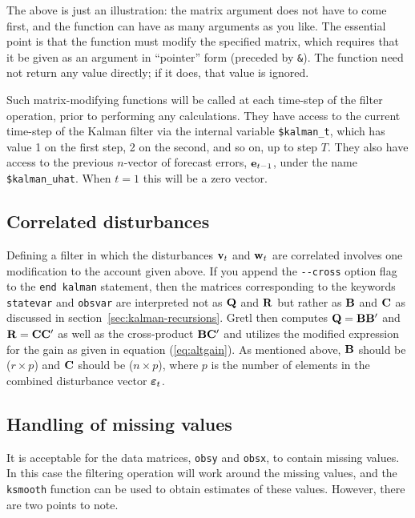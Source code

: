 The above is just an illustration: the matrix argument does not have
to come first, and the function can have as many arguments as you
like.  The essential point is that the function must modify the
specified matrix, which requires that it be given as an argument in
``pointer'' form (preceded by \verb|&|).  The function need not return
any value directly; if it does, that value is ignored.

Such matrix-modifying functions will be called at each time-step of
the filter operation, prior to performing any calculations.  They have
access to the current time-step of the Kalman filter via the internal
variable \verb+$kalman_t+, which has value 1 on the first step, 2 on
the second, and so on, up to step $T$.  They also have access to the
previous $n$-vector of forecast errors, $\mathbf{e}_{t-1}$, under the
name \verb+$kalman_uhat+.  When $t=1$ this will be a zero vector.

\subsection{Correlated disturbances}

Defining a filter in which the disturbances $\mathbf{v}_t$ and
$\mathbf{w}_t$ are correlated involves one modification to the account
given above.  If you append the \verb|--cross| option flag to the
\texttt{end kalman} statement, then the matrices corresponding to
the keywords \texttt{statevar} and \texttt{obsvar} are interpreted
not as $\mathbf{Q}$ and $\mathbf{R}$ but rather as $\mathbf{B}$ and
$\mathbf{C}$ as discussed in section~\ref{sec:kalman-recursions}.
Gretl then computes $\mathbf{Q} = \mathbf{B}\mathbf{B}'$ and
$\mathbf{R} = \mathbf{C}\mathbf{C}'$ as well as the cross-product
$\mathbf{B}\mathbf{C}'$ and utilizes the modified expression for
the gain as given in equation (\ref{eq:altgain}).  As mentioned
above, $\mathbf{B}$ should be ($r \times p$) and $\mathbf{C}$
should be ($n \times p$), where $p$ is the number of elements
in the combined disturbance vector $\bm{\varepsilon}_t$.

\subsection{Handling of missing values}

It is acceptable for the data matrices, \texttt{obsy} and
\texttt{obsx}, to contain missing values.  In this case the filtering
operation will work around the missing values, and the \texttt{ksmooth}
function can be used to obtain estimates of these values.  However,
there are two points to note.

